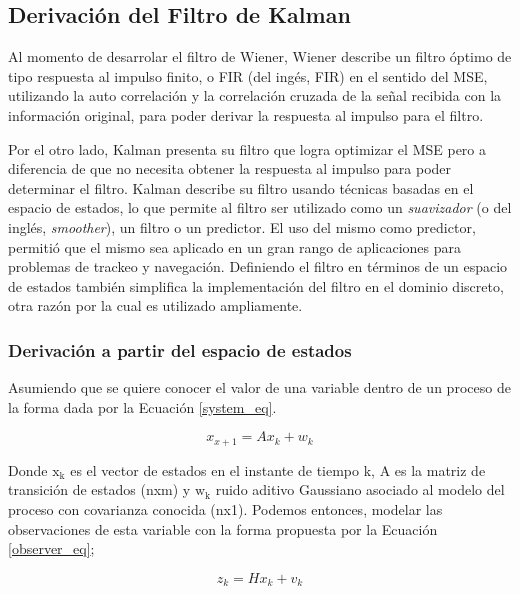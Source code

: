 \documentclass[10pt,a4paper]{article}
\begin{document}
\subsection{Derivaci\'on del Filtro de Kalman}

\noindent Al momento de desarrolar el filtro de Wiener, Wiener describe un 
filtro \'optimo de tipo respuesta al impulso finito, o \acrshort{FIR} (del 
ing\'es, \acrlong{FIR}) en el sentido del \acrshort{MSE}, utilizando la auto
correlaci\'on y la correlaci\'on cruzada de la señal recibida con la
informaci\'on original, para poder derivar la respuesta al impulso para el
filtro. 

\noindent Por el otro lado, Kalman presenta su filtro que logra optimizar el
\acrshort{MSE} pero a diferencia de que no necesita obtener la respuesta al
impulso para poder determinar el filtro. Kalman describe su filtro usando
t\'ecnicas basadas en el espacio de estados, lo que permite al filtro ser
utilizado como un \emph{suavizador} (o del ingl\'es, \emph{smoother}), un filtro
o un predictor. El uso del mismo como predictor, permiti\'o que el mismo sea
aplicado en un gran rango de aplicaciones para problemas de trackeo y
navegaci\'on. Definiendo el filtro en t\'erminos de un espacio de estados
tambi\'en simplifica la implementaci\'on del filtro en el dominio discreto, otra
raz\'on por la cual es utilizado ampliamente.

\subsubsection{Derivaci\'on a partir del espacio de estados}

\noindent Asumiendo que se quiere conocer el valor de una variable dentro de un 
proceso de la forma dada por la Ecuaci\'on \ref{system_eq}.

\begin{equation}
    x_{x+1} = Ax_k + w_k \label{system_eq}
\end{equation}

\noindent Donde $\mathrm{x_k}$ es el vector de estados en el instante de tiempo 
k, A es la matriz de transici\'on de estados (nxm) y $\mathrm{w_k}$ ruido 
aditivo Gaussiano asociado al modelo del proceso con covarianza conocida (nx1). 
Podemos entonces, modelar las observaciones de esta variable con la forma 
propuesta por la Ecuaci\'on \ref{observer_eq};

\begin{equation}
    z_k = Hx_k + v_k \label{observer_eq}
\end{equation}
\end{document}
